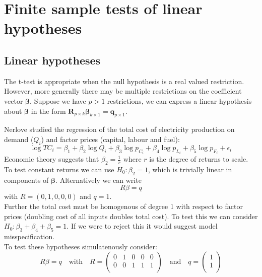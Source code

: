 \documentclass[DIV=14,titlepage=false]{scrreprt}
\begin{document}
\vspace{-10pt}
\setcounter{chapter}{4}

\chapter{Finite sample tests of linear hypotheses}
\vspace{-10pt}
\section{Linear hypotheses}
The t-test is appropriate when the null hypothesis is a real valued restriction. However, more generally there may be multiple restrictions on the coefficient vector $\boldsymbol{\beta}$. Suppose we have $p>1$ restrictions, we can express a linear hypothesis about $\boldsymbol{\beta}$ in the form $\boldsymbol{R}_{p \times k}\boldsymbol{\beta}_{k \times 1}=\boldsymbol{q}_{p \times 1}$.

\begin{example}
    Nerlove studied the regression of the total cost of electricity production on demand ($Q_i$) and factor prices (capital, labour and fuel):
    \[ \log TC_i = \beta_1 + \beta_2 \log Q_i + \beta_3 \log p_{C_i} + \beta_4 \log p_{L_i}+ \beta_5 \log p_{F_i} + \epsilon_i \]
    Economic theory suggests that $\beta_2=\frac{1}{r}$ where $r$ is the degree of returns to scale. To test constant returns we can use $H_0: \beta_2=1$, which is trivially linear in components of $\boldsymbol{\beta}$. Alternatively we can write \[R\beta=q\] with $R=(0,1,0,0,0)$ and $q=1$.\\
    Further the total cost must be homogenous of degree 1 with respect to factor prices (doubling cost of all inputs doubles total cost). To test this we can consider $H_0: \beta_3 + \beta_4 +\beta_5 =1$. If we were to reject this it would suggest model misspecification.\\
    To test these hypotheses simulatenously consider:
    \[
        R\beta = q \quad \text{with} \quad R = \begin{pmatrix}
        0 & 1 & 0 & 0 & 0 \\
        0 & 0 & 1 & 1 & 1 \\
        \end{pmatrix}
        \quad \text{and} \quad q = \begin{pmatrix}
        1 \\
        1 \\
        \end{pmatrix}
        \]
\end{example}
\end{document}
